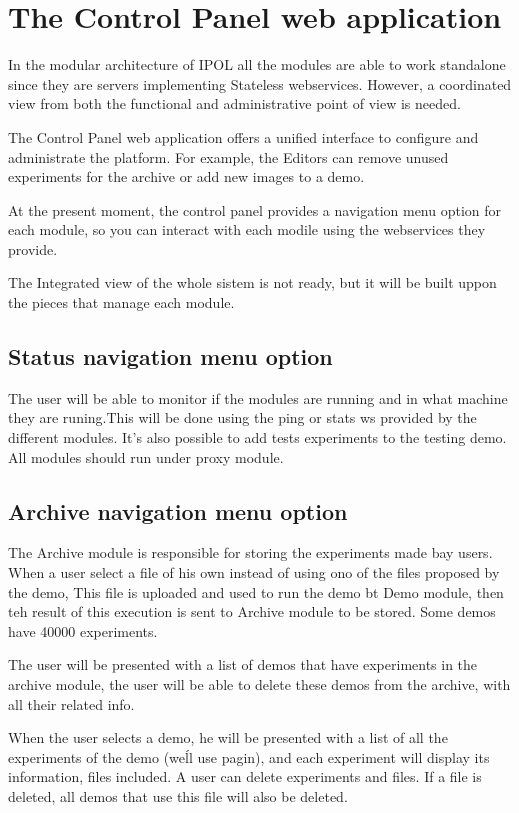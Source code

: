 \section{The Control Panel web application}
In the modular architecture of IPOL all the modules are able to work standalone since they are servers implementing Stateless webservices. However, a coordinated view from both the functional and administrative point of view is needed.

The Control Panel web application offers a unified interface to configure and administrate the platform. For example, the Editors can remove unused experiments for the archive or add new images to a demo.

At the present moment, the control panel provides a navigation menu option for each module, so you can interact with each modile using the webservices they provide.

The Integrated view of the whole sistem is not ready, but it will be built uppon the pieces that manage each module. 

\subsection{Status navigation menu option}
The user will be able to monitor if the modules are running and in what machine they are runing.This will be done using the ping or stats ws provided by the different modules.
It's also possible to add tests experiments to the testing demo.
All modules should run under proxy module.

\subsection{Archive navigation menu option}
The Archive module is responsible for storing the experiments made bay users. When a user select a file of his own instead of using ono of the files proposed by the demo, This file is uploaded and used to run the demo bt Demo module, then teh result of this execution is sent to Archive module to be stored. Some demos have 40000 experiments.

The user will be presented with a list of demos that have experiments in the archive module, the user will be able to delete these demos from the archive, with all their related info.

When the user selects a demo, he will be presented with a list of all the experiments of the demo (we\'ll use pagin), and each experiment will display its information, files included. A user can delete experiments and files. If a file is deleted, all demos that use this file will also be deleted.


